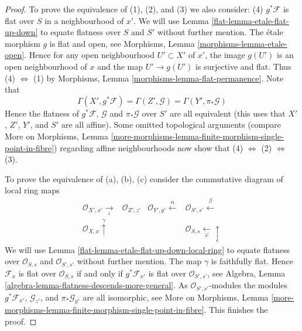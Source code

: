 \begin{proof}

To prove the equivalence of (1), (2), and (3) we also consider:
(4) $g^*\mathcal{F}$ is flat over $S$ in a neighbourhood of $x'$.
We will use
Lemma \ref{flat-lemma-etale-flat-up-down}
to equate flatness over $S$ and $S'$ without further mention.
The \'etale morphism $g$ is flat and open, see
Morphisms, Lemma \ref{morphisms-lemma-etale-open}.
Hence for any open neighbourhood $U' \subset X'$ of $x'$, the image
$g(U')$ is an open neighbourhood of $x$ and the map
$U' \to g(U')$ is surjective and flat.
Thus (4) $\Leftrightarrow$ (1) by
Morphisms, Lemma \ref{morphisms-lemma-flat-permanence}.
Note that
$$
\Gamma(X', g^*\mathcal{F}) =
\Gamma(Z', \mathcal{G}) =
\Gamma(Y', \pi_*\mathcal{G})
$$
Hence the flatness of $g^*\mathcal{F}$, $\mathcal{G}$ and $\pi_*\mathcal{G}$
over $S'$ are all equivalent (this uses that $X'$, $Z'$, $Y'$, and
$S'$ are all affine). Some omitted topological arguments (compare
More on Morphisms,
Lemma \ref{more-morphisms-lemma-finite-morphism-single-point-in-fibre})
regarding affine neighbourhoods now show that
(4) $\Leftrightarrow$ (2) $\Leftrightarrow$ (3).

\medskip\noindent
To prove the equivalence of (a), (b), (c) consider the commutative diagram
of local ring maps
$$
\begin{array}{cccc}\mathcal{O}_{X', x'} \underset{\iota}{\longrightarrow} & \mathcal{O}_{Z', z'} & \mathcal{O}_{Y', y'} \overset{\alpha}{\longleftarrow} & \mathcal{O}_{S', s'} \overset{\beta}{\longleftarrow} \\ \mathcal{O}_{X, x} \overset{\gamma}{\uparrow} &  &  & \mathcal{O}_{S, s} \underset{\varphi}{\longleftarrow}\underset{\epsilon}{\uparrow}\end{array}
$$
We will use
Lemma \ref{flat-lemma-etale-flat-up-down-local-ring}
to equate flatness over $\mathcal{O}_{S, s}$ and $\mathcal{O}_{S', s'}$
without further mention.
The map $\gamma$ is faithfully flat. Hence
$\mathcal{F}_x$ is flat over $\mathcal{O}_{S, s}$
if and only if $g^*\mathcal{F}_{x'}$ is flat over
$\mathcal{O}_{S', s'}$, see
Algebra, Lemma \ref{algebra-lemma-flatness-descends-more-general}.
As $\mathcal{O}_{S', s'}$-modules the modules
$g^*\mathcal{F}_{x'}$, $\mathcal{G}_{z'}$, and
$\pi_*\mathcal{G}_{y'}$ are all isomorphic, see
More on Morphisms,
Lemma \ref{more-morphisms-lemma-finite-morphism-single-point-in-fibre}.
This finishes the proof.
\end{proof}


